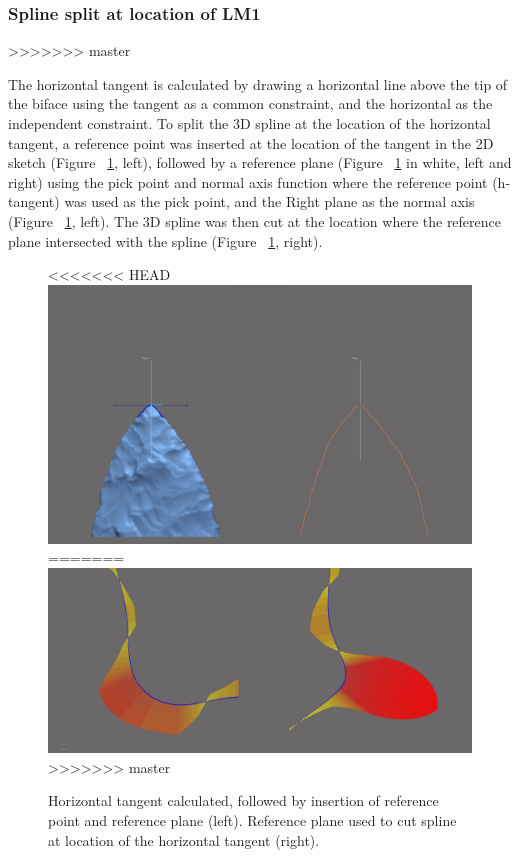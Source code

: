 \documentclass[review]{elsarticle}
\begin{document}
\subsubsection{Spline split at location of LM1}
>>>>>>> master

The horizontal tangent is calculated by drawing a horizontal line above the tip of the biface using the tangent as a common constraint, and the horizontal as the independent constraint. To split the 3D spline at the location of the horizontal tangent, a reference point was inserted at the location of the tangent in the 2D sketch (Figure ~\ref{fig:figLM1}, left), followed by a reference plane (Figure ~\ref{fig:figLM1} in white, left and right) using the pick point and normal axis function where the reference point (h-tangent) was used as the pick point, and the Right plane as the normal axis (Figure ~\ref{fig:figLM1}, left). The 3D spline was then cut at the location where the reference plane intersected with the spline (Figure ~\ref{fig:figLM1}, right).

\begin{figure}[ht]\centering
<<<<<<< HEAD
\includegraphics[width=\linewidth]{analysis/images/lm1.pdf}
=======
\includegraphics[width=\linewidth]{analysis/images/splinesplit1.pdf}
>>>>>>> master
\caption{Horizontal tangent calculated, followed by insertion of reference point and reference plane (left). Reference plane used to cut spline at location of the horizontal tangent (right).}
\label{fig:figLM1}
\end{figure}
\end{document}
